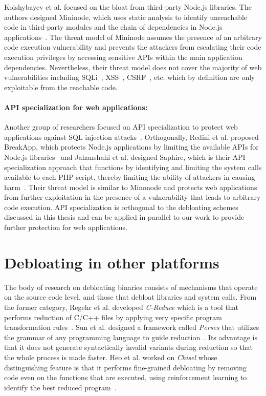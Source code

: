 Koishybayev et al. focused on the bloat from third-party Node.js libraries. 
The authors designed Mininode, which uses static analysis to identify unreachable code in third-party modules and the chain of dependencies in Node.js applications~\cite{mininode}. 
The threat model of Mininode assumes the presence of an arbitrary code execution vulnerability and prevents the attackers from escalating their code execution privileges by accessing sensitive APIs within the main application dependencies. 
Nevertheless, their threat model does not cover the majority of web vulnerabilities including SQLi~\cite{sqlInjection}, XSS~\cite{xss}, CSRF~\cite{csrf}, etc. which by definition are only exploitable from the reachable code. 

\paragraph{API specialization for web applications:} Another group of researchers focused on API specialization to protect web applications against SQL injection attacks~\cite{jahanshahi2020you}.
Orthogonally, Redini et al. proposed BreakApp, which protects Node.js applications by limiting the available APIs for Node.js libraries~\cite{vasilakis2018breakapp} and Jahanshahi et al. designed Saphire, which is their API specialization approach that functions by identifying and limiting the system calls available to each PHP script, thereby limiting the ability of attackers in causing harm~\cite{saphire}. 
Their threat model is similar to Minonode and protects web applications from further exploitation in the presence of a vulnerability that leads to arbitrary code execution. 
API specialization is orthogonal to the debloating schemes discussed in this thesis and can be applied in parallel to our work to provide further protection for web applications. 


\section{Debloating in other platforms}

The body of research on debloating binaries consists of mechanisms that operate on the source code level, and those that debloat libraries and system calls. 
From the former category, Regehr et al. developed \textit{C-Reduce} which is a tool that performs reduction of C/C++ files by applying very specific program transformation rules~\cite{regehr2012CReduce}.
Sun et al. designed a framework called \textit{Perses} that utilizes the grammar of any programming language to guide reduction~\cite{sun2018perses}.
Its advantage is that it does not generate syntactically invalid variants during reduction so that the whole process is made faster.
Heo et al. worked on \textit{Chisel} whose distinguishing feature is that it performs fine-grained debloating by removing code even on the functions that are executed, using reinforcement learning to identify the best reduced program~\cite{heo2018effective}.

